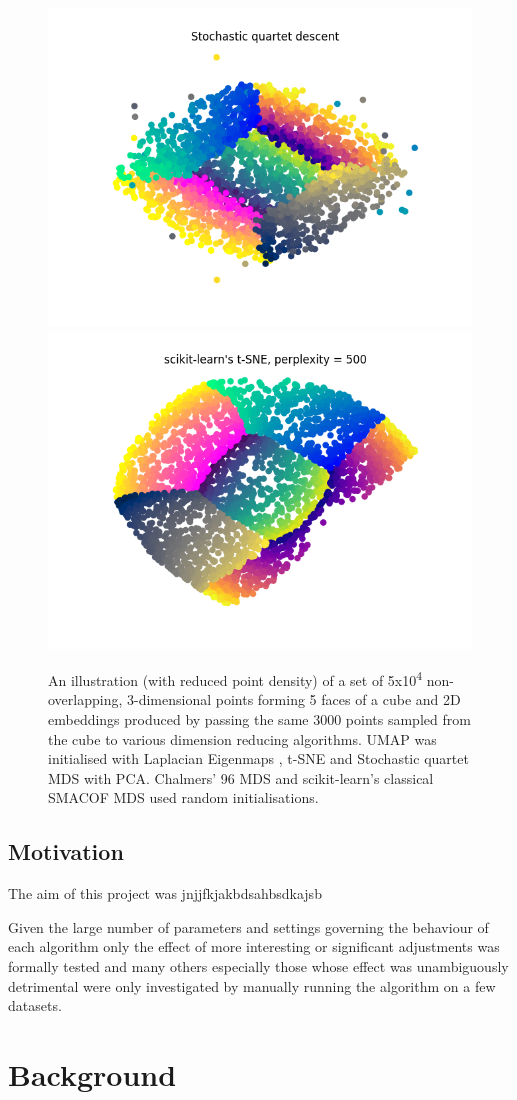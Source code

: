 \documentclass{l4proj}
\begin{document}
\begin{figure}[htb]
    \includegraphics[width=0.3\linewidth]{images/cube/Stochastic quartet descent.png}
    \includegraphics[width=0.3\linewidth]{images/cube/tsne_cube.png}\\

    \caption{An illustration (with reduced point density) of a set of 5x10\textsuperscript{4} non-overlapping, 3-dimensional points forming 5 faces of a cube and 2D embeddings produced by passing the same 3000 points sampled from the cube to various dimension reducing algorithms. UMAP was initialised with Laplacian Eigenmaps \citep{laplacian_eigen}, t-SNE and Stochastic quartet MDS with PCA. Chalmers' 96 MDS and scikit-learn's classical SMACOF MDS used random initialisations.
    }

    \label{fig:init_demo} 
\end{figure}

\section{Motivation}

The aim of this project was jnjjfkjakbdsahbsdkajsb

Given the large number of parameters and settings governing the behaviour of each algorithm only the effect of more interesting or significant adjustments was formally tested and many others especially those whose effect was unambiguously detrimental were only investigated by manually running the algorithm on a few datasets. 
\chapter{Background}
\end{document}
